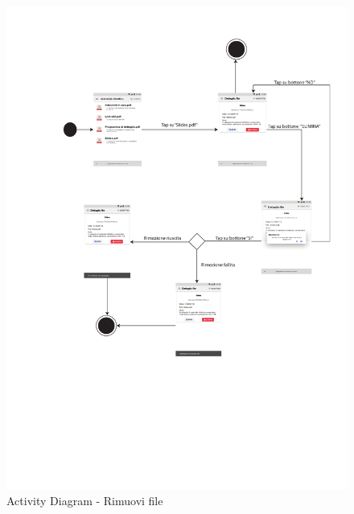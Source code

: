 \begin{figure}
	\centering
	\includegraphics[width=6in]{imgs/gruppo1/activity_diagrams/AD17_rimuovi_file.pdf}
	\caption{Activity Diagram - Rimuovi file}
	\label{diag:rimuoviFileAD}
\end{figure}

\clearpage